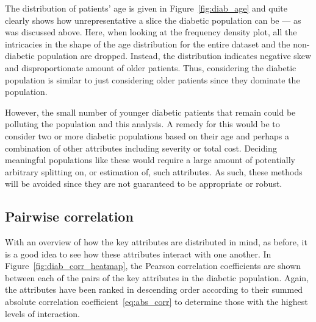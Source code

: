 The distribution of patients' age is given in Figure~\ref{fig:diab_age} and
quite clearly shows how unrepresentative a slice the diabetic population can be
--- as was discussed above. Here, when looking at the frequency density plot,
all the intricacies in the shape of the age distribution for the entire dataset
and the non-diabetic population are dropped. Instead, the distribution indicates
negative skew and disproportionate amount of older patients. Thus, considering
the diabetic population is similar to just considering older patients since they
dominate the population.

However, the small number of younger diabetic patients
that remain could be polluting the population and this analysis. A remedy for
this would be to consider two or more diabetic populations based on their age
and perhaps a combination of other attributes including severity or total cost.
Deciding meaningful populations like these would require a large amount of
potentially arbitrary splitting on, or estimation of, such attributes. As such,
these methods will be avoided since they are not guaranteed to be appropriate or
robust.


\subsection{Pairwise correlation}\label{subsec:diab_correlation}

With an overview of how the key attributes are distributed in mind, as before,
it is a good idea to see how these attributes interact with one another. In
Figure~\ref{fig:diab_corr_heatmap}, the Pearson correlation coefficients
are shown between each of the pairs of the key attributes in the diabetic
population. Again, the attributes have been ranked in descending order according
to their summed absolute correlation coefficient~\eqref{eq:abs_corr} to
determine those with the highest levels of interaction.

